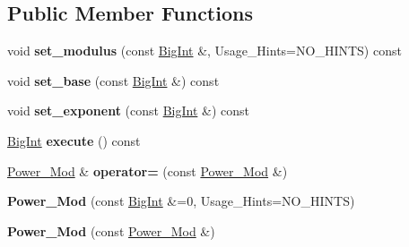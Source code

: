 \subsection*{Public Member Functions}
\begin{DoxyCompactItemize}
\item 
\hypertarget{classBotan_1_1Power__Mod_a4a5274c4da6c6f1bef664f26a54cf901}{void {\bfseries set\-\_\-modulus} (const \hyperlink{classBotan_1_1BigInt}{Big\-Int} \&, Usage\-\_\-\-Hints=N\-O\-\_\-\-H\-I\-N\-T\-S) const }\label{classBotan_1_1Power__Mod_a4a5274c4da6c6f1bef664f26a54cf901}

\item 
\hypertarget{classBotan_1_1Power__Mod_af339838538d680b2f230cd3f81050bcd}{void {\bfseries set\-\_\-base} (const \hyperlink{classBotan_1_1BigInt}{Big\-Int} \&) const }\label{classBotan_1_1Power__Mod_af339838538d680b2f230cd3f81050bcd}

\item 
\hypertarget{classBotan_1_1Power__Mod_a16917b68d019afb91144fccde0837c17}{void {\bfseries set\-\_\-exponent} (const \hyperlink{classBotan_1_1BigInt}{Big\-Int} \&) const }\label{classBotan_1_1Power__Mod_a16917b68d019afb91144fccde0837c17}

\item 
\hypertarget{classBotan_1_1Power__Mod_afcc10f9086fd2207d408cdcad4f28f45}{\hyperlink{classBotan_1_1BigInt}{Big\-Int} {\bfseries execute} () const }\label{classBotan_1_1Power__Mod_afcc10f9086fd2207d408cdcad4f28f45}

\item 
\hypertarget{classBotan_1_1Power__Mod_adbc11c8816796bbe4b78e8ec10408ac7}{\hyperlink{classBotan_1_1Power__Mod}{Power\-\_\-\-Mod} \& {\bfseries operator=} (const \hyperlink{classBotan_1_1Power__Mod}{Power\-\_\-\-Mod} \&)}\label{classBotan_1_1Power__Mod_adbc11c8816796bbe4b78e8ec10408ac7}

\item 
\hypertarget{classBotan_1_1Power__Mod_ae22fabbf97b888d2cc691f4e1d076618}{{\bfseries Power\-\_\-\-Mod} (const \hyperlink{classBotan_1_1BigInt}{Big\-Int} \&=0, Usage\-\_\-\-Hints=N\-O\-\_\-\-H\-I\-N\-T\-S)}\label{classBotan_1_1Power__Mod_ae22fabbf97b888d2cc691f4e1d076618}

\item 
\hypertarget{classBotan_1_1Power__Mod_a95f9117d6d3dd069c24c2cf69dc5824d}{{\bfseries Power\-\_\-\-Mod} (const \hyperlink{classBotan_1_1Power__Mod}{Power\-\_\-\-Mod} \&)}\label{classBotan_1_1Power__Mod_a95f9117d6d3dd069c24c2cf69dc5824d}

\end{DoxyCompactItemize}
